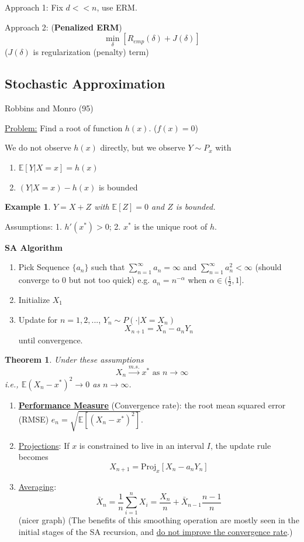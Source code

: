 \documentclass[11pt,a4paper]{article}
\newtheorem{theorem}{Theorem}
\newtheorem{example}{Example}
\begin{document}
Approach 1: Fix $d<<n$, use ERM.

Approach 2: (\textbf{Penalized ERM}) $$\min_\delta [R_{emp}(\delta)+J(\delta)]$$ ($J(\delta)$ is regularization (penalty) term)

\subsection{Stochastic Approximation}
Robbins and Monro (95)

\underline{Problem:} Find a root of function $h(x)$. ($f(x)=0$)

We do not observe $h(x)$ directly, but we observe $Y\sim P_x$ with
\begin{enumerate}[(1)]
    \item $\mathbb{E}[Y|X=x]=h(x)$
    \item $(Y|X=x)-h(x)$ is bounded
\end{enumerate}
\begin{example}
    $Y=X+Z$ with $\mathbb{E}[Z]=0$ and $Z$ is bounded.
\end{example}
Assumptions: 1. $h'(x^*)>0$; 2. $x^*$ is the unique root of $h$.

\textbf{SA Algorithm}
\begin{enumerate}[$\bullet$]
    \item Pick Sequence $\{a_n\}$ such that $\sum_{n=1}^\infty a_n=\infty$ and $\sum_{n=1}^\infty a^2_n<\infty$ (should converge to $0$ but not too quick) e.g. $a_n=n^{-\alpha}$ when $\alpha\in (\frac{1}{2},1]$.
    \item Initialize $X_1$
    \item Update for $n=1,2,...$, $Y_n\sim P(\cdot|X=X_n)$ $$X_{n+1}=X_n-a_n Y_n$$ until convergence.
\end{enumerate}

\begin{theorem}
    Under these assumptions $$X_n \stackrel{m.s.}{\longrightarrow} x^*\text{ as }n \rightarrow \infty$$ i.e., $\mathbb{E}(X_n-x^*)^2 \rightarrow 0$ as $n \rightarrow \infty$.
\end{theorem}

\begin{enumerate}[$\bullet$]
    \item \textbf{\underline{Performance Measure}} (Convergence rate): the root mean squared error (RMSE) $e_n=\sqrt{\mathbb{E}[(X_n-x^*)^2]}$.
    \item \underline{Projections}: If $x$ is constrained to live in an interval $I$, the update rule becomes $$X_{n+1}=\text{Proj}_x[X_n-a_nY_n]$$
    \item \underline{Averaging}: $$\bar{X}_n=\frac{1}{n}\sum_{i=1}^nX_i=\frac{X_n}{n}+\bar{X}_{n-1}\frac{n-1}{n}$$(nicer graph) (The benefits of this smoothing operation are mostly seen in the initial stages of the SA recursion, and \underline{do not improve the convergence rate}.)
\end{enumerate}
\end{document}
